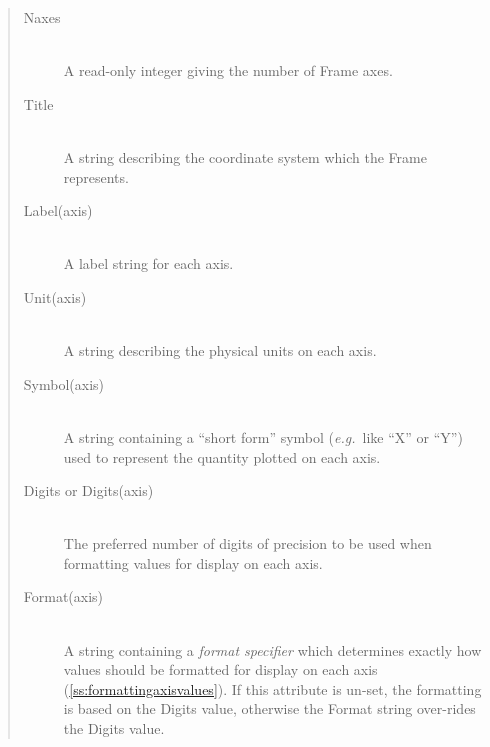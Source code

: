 \documentclass[twoside,11pt]{article}
\newenvironment{latexonly}{}{}
\newcommand{\htmlref}[2]{#1}
\newcommand{\secref}[1]{\S\ref{#1}}
\renewcommand{\secref}[1]{\ref{#1}}
\begin{document}
\begin{quote}
\begin{description}
\item[\htmlref{Naxes}{Naxes}]\begin{latexonly}\mbox{}\\ \end{latexonly}
A read-only integer giving the number of Frame axes.

\item[\htmlref{Title}{Title}]\begin{latexonly}\mbox{}\\ \end{latexonly}
A string describing the coordinate system which the Frame represents.

\item[\htmlref{Label(axis)}{Labelaxis}]\begin{latexonly}\mbox{}\\ \end{latexonly}
A label string for each axis.

\item[\htmlref{Unit(axis)}{Unitaxis}]\begin{latexonly}\mbox{}\\ \end{latexonly}
A string describing the physical units on each axis.

\item[\htmlref{Symbol(axis)}{Symbolaxis}]\begin{latexonly}\mbox{}\\ \end{latexonly}
A string containing a ``short form'' symbol ({\em{e.g.}}\ like ``X''
or ``Y'') used to represent the quantity plotted on each axis.

\item[Digits or Digits(axis)]\begin{latexonly}\mbox{}\\ \end{latexonly}
The preferred number of digits of precision to be used when formatting
values for display on each axis.

\item[\htmlref{Format(axis)}{Formataxis}]\begin{latexonly}\mbox{}\\ \end{latexonly}
A string containing a {\em{format specifier}} which determines exactly
how values should be formatted for display on each axis
(\secref{ss:formattingaxisvalues}). If this attribute is un-set, the
formatting is based on the Digits value, otherwise the Format string
over-rides the Digits value.


\end{description}
\end{quote}
\end{document}
